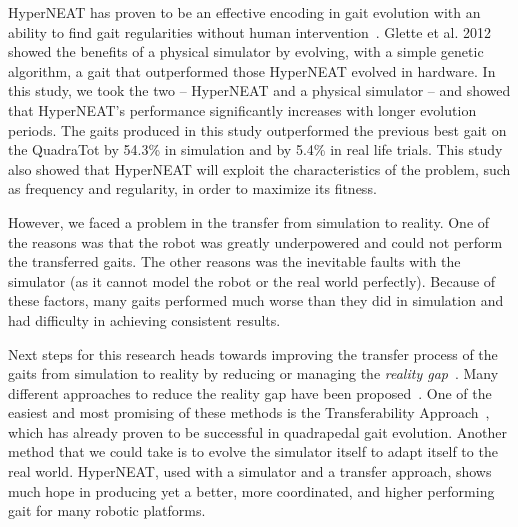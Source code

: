 

HyperNEAT has proven to be an effective encoding in gait evolution with an ability to find gait regularities without human intervention~\cite{clune2009evolving,clune2011performance,yos:clune}. Glette et al. 2012~\cite{glette} showed the benefits of a physical simulator by evolving, with a simple genetic algorithm, a gait that outperformed those HyperNEAT evolved in hardware.
In this study, we took the two -- HyperNEAT and a physical simulator -- and showed that HyperNEAT's performance significantly increases with longer evolution periods. The gaits produced in this study outperformed the previous best gait on the QuadraTot by 54.3\% in simulation and by 5.4\% in real life trials. This study also showed that HyperNEAT will exploit the characteristics of the problem, such as frequency and regularity, in order to maximize its fitness.


However, we faced a problem in the transfer from simulation to reality. %
One of the reasons was that the robot was greatly underpowered and could not perform the transferred gaits. The other reasons was the inevitable faults with the simulator (as it cannot model the robot or the real world perfectly). Because of these factors, many gaits performed much worse than they did in simulation and had difficulty in achieving consistent results. 


Next steps for this research heads towards improving the transfer process of the gaits from simulation to reality by reducing or managing the \emph{reality gap}~\cite{jakobi}. Many different approaches to reduce the reality gap have been proposed~\cite{koos2010crossing,bongard,zagal}. One of the easiest and most promising of these methods is the Transferability Approach~\cite{koos2011transferability}, which has already proven to be successful in quadrapedal gait evolution. Another method that we could take is to evolve the simulator itself to adapt itself to the real world. HyperNEAT, used with a simulator and a transfer approach, shows much hope in producing yet a better, more coordinated, and higher performing gait for many robotic platforms.
